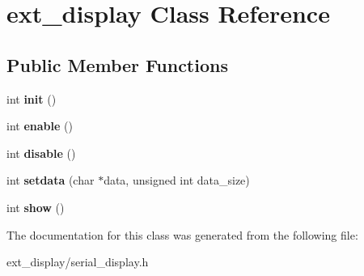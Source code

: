 \hypertarget{classext__display}{}\section{ext\+\_\+display Class Reference}
\label{classext__display}
\subsection*{Public Member Functions}
\begin{DoxyCompactItemize}
\item 
int {\bfseries init} ()
\item 
int {\bfseries enable} ()
\item 
int {\bfseries disable} ()
\item 
int {\bfseries setdata} (char $\ast$data, unsigned int data\+\_\+size)
\item 
int {\bfseries show} ()
\end{DoxyCompactItemize}


The documentation for this class was generated from the following file\+:\begin{DoxyCompactItemize}
\item 
ext\+\_\+display/serial\+\_\+display.\+h\end{DoxyCompactItemize}
